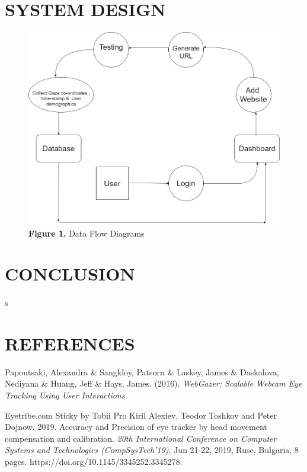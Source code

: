\documentclass[a4paper,12pt,oneside]{article}
\let\counterwithin\relax
\begin{document}
\newpage
\section{SYSTEM DESIGN}
    \begin{figure}[H]
    \includegraphics[scale=0.5]{DFD.png}
    \centering
    \caption[ Data Flow Diagrams]{\textbf{Figure 1.}  Data Flow Diagrams}
    \end{figure}




\newpage
\section{CONCLUSION}
\paragraph{}


\newpage

s\section{REFERENCES}
\begin{thebibliography}{9}
    Papoutsaki, Alexandra \& Sangkloy, Patsorn \& Laskey, James \& Daskalova, Nediyana \& Huang, Jeff \& Hays, James. (2016). \emph{WebGazer: Scalable Webcam Eye Tracking Using User Interactions.}

    Eyetribe.com
    Sticky by Tobii Pro
    Kiril Alexiev, Teodor Toshkov and Peter Dojnow. 2019. Accuracy and Precision of eye tracker by head movement compensation and calibration. \emph{20th International Conference on Computer Systems and Technologies
(CompSysTech'19)}, Jun 21-22, 2019, Ruse, Bulgaria, 8 pages.
https://doi.org/10.1145/3345252.3345278.



\end{thebibliography}
\end{document}
